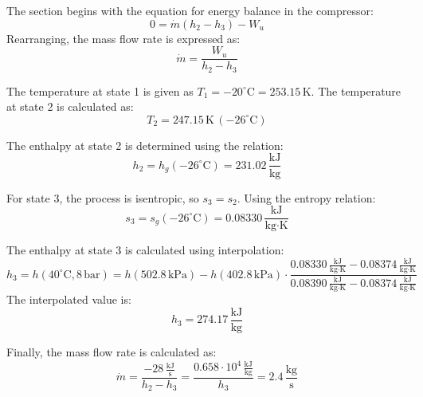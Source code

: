 The section begins with the equation for energy balance in the compressor:  
\[
0 = \dot{m} (h_2 - h_3) - W_u
\]  
Rearranging, the mass flow rate is expressed as:  
\[
\dot{m} = \frac{W_u}{h_2 - h_3}
\]  

The temperature at state 1 is given as \( T_1 = -20^\circ\text{C} = 253.15 \, \text{K} \).  
The temperature at state 2 is calculated as:  
\[
T_2 = 247.15 \, \text{K} \, (-26^\circ\text{C})
\]  

The enthalpy at state 2 is determined using the relation:  
\[
h_2 = h_g(-26^\circ\text{C}) = 231.02 \, \frac{\text{kJ}}{\text{kg}}
\]  

For state 3, the process is isentropic, so \( s_3 = s_2 \). Using the entropy relation:  
\[
s_3 = s_g(-26^\circ\text{C}) = 0.08330 \, \frac{\text{kJ}}{\text{kg·K}}
\]  

The enthalpy at state 3 is calculated using interpolation:  
\[
h_3 = h(40^\circ\text{C}, 8 \, \text{bar}) = h(502.8 \, \text{kPa}) - h(402.8 \, \text{kPa}) \cdot \frac{0.08330 \, \frac{\text{kJ}}{\text{kg·K}} - 0.08374 \, \frac{\text{kJ}}{\text{kg·K}}}{0.08390 \, \frac{\text{kJ}}{\text{kg·K}} - 0.08374 \, \frac{\text{kJ}}{\text{kg·K}}}
\]  
The interpolated value is:  
\[
h_3 = 274.17 \, \frac{\text{kJ}}{\text{kg}}
\]  

Finally, the mass flow rate is calculated as:  
\[
\dot{m} = \frac{-28 \, \frac{\text{kJ}}{\text{s}}}{h_2 - h_3} = \frac{0.658 \cdot 10^4 \, \frac{\text{kJ}}{\text{kg}}}{h_3} = 2.4 \, \frac{\text{kg}}{\text{s}}
\]